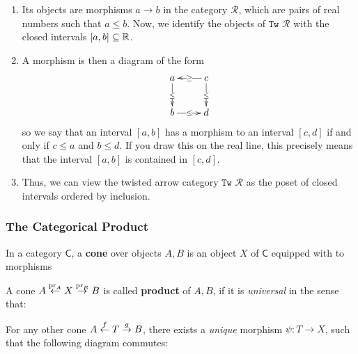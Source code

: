 \begin{enumerate}
  \item Its objects are morphisms $a \to b$ in the category $\mathcal{R}$, which are pairs of real numbers such that $a \leq b$.
    Now, we identify the objects of $\texttt{Tw }\mathcal{R}$ with the closed intervals $[a,b] \subseteq \mathbb{R}$.
  \item A morphism is then a diagram of the form
    \begin{align*}
      \xymatrix{
        a
        \ar[d]|{\leq}
        &
        c
        \ar[l]|{\geq}
        \ar[d]|{\leq}
        \\
        b
        \ar[r]|{\leq}
        &
        d
      }
    \end{align*}
    so we say that an interval $[a,b]$ has a morphism to an interval $[c,d]$ if and only if $c \leq a$ and $b \leq d$.
    If you draw this on the real line, this precisely means that the interval $[a,b]$ is contained in $[c,d]$.
  \item Thus, we can view the twisted arrow category $\texttt{Tw }\mathcal{R}$ as the poset of closed intervals ordered by inclusion.
\end{enumerate}


\subsubsection{The Categorical Product}
In a category $\textsf{C}$, a \textbf{cone} over objects $A,B$ is an object $X$ of $\textsf{C}$ equipped with to morphisms

\begin{center}
\end{center}
A cone $A \stackrel{\text{pr}_A}{\leftarrow} X \stackrel{\text{pr}_B}{\to} B$ is called \textbf{product} of $A,B$, if it is \emph{universal} in the sense that:

For any other cone $A \stackrel{f}{\leftarrow}T \stackrel{g}{\to}B$, there exists a \emph{unique} morphism $\psi: T \to X$, such that the following diagram commutes:

\begin{center}
\end{center}

